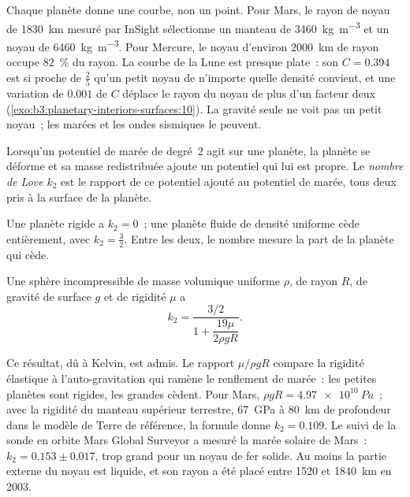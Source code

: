 Chaque planète donne une courbe, non un point. Pour Mars, le rayon de noyau de
\qty{1830}{km} mesuré par InSight sélectionne un manteau de \qty{3460}{kg.m^{-3}}
et un noyau de \qty{6460}{kg.m^{-3}}. Pour Mercure, le noyau d'environ
\qty{2000}{km} de rayon occupe 82~\% du rayon. La courbe de la Lune est
presque plate~: son $C = 0.394$ est si proche de $\tfrac25$ qu'un petit noyau
de n'importe quelle densité convient, et une variation de $0.001$ de $C$ déplace le
rayon du noyau de plus d'un facteur deux (\cref{exo:b3:planetary-interiors-surfaces:10}).
La gravité seule ne voit pas un petit noyau~; les marées et les ondes sismiques le peuvent.

\begin{definition}\label{def:b3:planetary-interiors-surfaces:love-number}
Lorsqu'un potentiel de marée de degré~2 agit sur une planète, la planète se déforme et
sa masse redistribuée ajoute un potentiel qui lui est propre. Le \emph{nombre de
Love} $k_2$ est le rapport de ce potentiel ajouté au
potentiel de marée, tous deux pris à la surface de la planète.
\end{definition}

Une planète rigide a $k_2 = 0$~; une planète fluide de densité uniforme cède
entièrement, avec $k_2 = \tfrac32$. Entre les deux, le nombre mesure la part
de la planète qui cède.

\begin{proposition}\label{prop:b3:planetary-interiors-surfaces:kelvin}
Une sphère incompressible de masse volumique uniforme $\rho$, de rayon $R$, de
gravité de surface $g$ et de rigidité $\mu$ a
\[
  k_2 = \frac{3/2}{1 + \dfrac{19\mu}{2\rho g R}} .
\]
\end{proposition}

Ce résultat, dû à Kelvin, est admis. Le rapport $\mu/\rho gR$ compare la rigidité
élastique à l'auto-gravitation qui ramène le renflement de marée~: les petites
planètes sont rigides, les grandes cèdent. Pour Mars, $\rho gR =
\qty{4.97e10}{Pa}$~; avec la rigidité du manteau supérieur terrestre,
\qty{67}{GPa} à \qty{80}{km} de profondeur dans le modèle de Terre de référence, la
formule donne $k_2 = 0.109$. Le suivi de la sonde en orbite Mars Global Surveyor
a mesuré la marée solaire de Mars~: $k_2 = 0.153 \pm 0.017$, trop
grand pour un noyau de fer solide. Au moins la partie externe du noyau est
liquide, et son rayon a été placé entre 1520 et \qty{1840}{km} en 2003.

